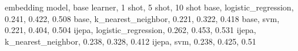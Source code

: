 embedding model, base learner, 1 shot, 5 shot, 10 shot
base, logistic_regression, 0.241, 0.422, 0.508
base, k_nearest_neighbor, 0.221, 0.322, 0.418
base, svm, 0.221, 0.404, 0.504
ijepa, logistic_regression, 0.262, 0.453, 0.531
ijepa, k_nearest_neighbor, 0.238, 0.328, 0.412
ijepa, svm, 0.238, 0.425, 0.51
